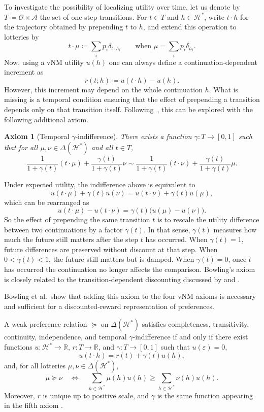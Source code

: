 \documentclass[11pt]{article}
\newtheorem{axiom}{Axiom}
\newcommand{\Hcal}{\mathcal{H}}
\newcommand{\Ofin}{\mathcal{O}}
\newcommand{\Afin}{\mathcal{A}}
\newcommand{\R}{\mathbb{R}}
\newcommand{\pref}{\succcurlyeq}
\newcommand{\indiff}{\sim}
\newcommand{\Lot}{\Delta}
\newcommand{\emptytraj}{\varepsilon}
\begin{document}
To investigate the possibility of localizing utility over time, let us
denote by $T \coloneqq \Ofin\times \Afin$ the set of one-step transitions. 
For $t\in T$ and $h\in \Hcal^*$, write
$t\cdot h$ for the trajectory obtained by prepending $t$ to $h$, and extend this
operation to lotteries by
\[
t\cdot \mu \coloneqq \sum_i p_i \delta_{t\cdot h_i}
\qquad
\text{when }
\mu=\sum_i p_i \delta_{h_i}.
\]
%
Now, using a vNM utility $u(h)$ one can always define a continuation-dependent
increment as
\[
r(t;h) \coloneqq u(t\cdot h)-u(h).
\]
However, this increment may depend on the whole continuation $h$. What is missing is a
temporal condition ensuring that the effect of prepending a transition depends
only on that transition itself. 
Following~\cite{bowling2023settling}, this can be explored with the following
additional axiom.

\begin{axiom}[Temporal $\gamma$-indifference]
There exists a function $\gamma\colon T\to[0,1]$ such that for all
$\mu,\nu\in\Lot(\Hcal^*)$ and all $t\in T$,
\[
\frac{1}{1+\gamma(t)}(t\cdot \mu)+\frac{\gamma(t)}{1+\gamma(t)}\nu
\indiff
\frac{1}{1+\gamma(t)}(t\cdot \nu)+\frac{\gamma(t)}{1+\gamma(t)}\mu.
\]
\end{axiom}

Under expected utility, the indifference above is equivalent to
\[
u(t\cdot \mu)+\gamma(t)u(\nu)=u(t\cdot \nu)+\gamma(t)u(\mu),
\]
which can be rearranged as
\[
u(t\cdot \mu)-u(t\cdot \nu)=\gamma(t)\bigl(u(\mu)-u(\nu)\bigr).
\]
So the effect of prepending the same transition $t$ is to rescale the utility
difference between two continuations by a factor $\gamma(t)$. In that sense,
$\gamma(t)$ measures how much the future still matters after the step $t$ has
occurred. When $\gamma(t)=1$, future differences are
preserved without discount at that step. When $0<\gamma(t)<1$, the future still
matters but is damped. When $\gamma(t)=0$, once $t$ has occurred the
continuation no longer affects the comparison. Bowling's axiom is closely
related to the transition-dependent discounting discussed by
\citet{white2017unifying} and \citet{pitis2019rethinking}.

Bowling et al.\ show that adding this axiom to the four vNM axioms is necessary
and sufficient for a discounted-reward representation of preferences.

\begin{theorem}
A weak preference relation $\pref$ on $\Lot(\Hcal^*)$ satisfies completeness,
transitivity, continuity, independence, and temporal $\gamma$-indifference if
and only if there exist functions $u\colon \Hcal^*\to\R$, $r\colon T\to\R$, and
$\gamma\colon T\to[0,1]$
such that $u(\emptytraj)=0$,
\[
u(t\cdot h)=r(t)+\gamma(t)u(h),
\]
and, for all lotteries $\mu,\nu\in\Lot(\Hcal^*)$,
\[
\mu\pref\nu
\quad\Longleftrightarrow\quad
\sum_{h\in\Hcal^*}\mu(h)u(h)\geq \sum_{h\in\Hcal^*}\nu(h)u(h).
\]
Moreover, $r$ is unique up to positive scale, and $\gamma$ is the same function
appearing in the fifth axiom \citep{bowling2023settling}.
\end{theorem}
\end{document}
